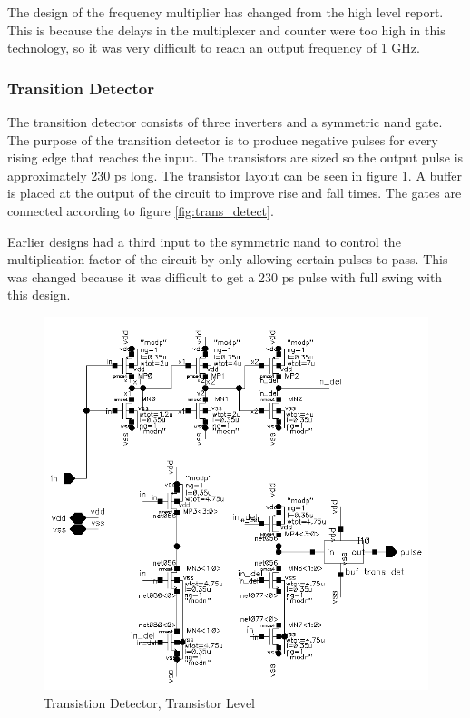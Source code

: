 \documentclass[a4paper,12pt]{article} \usepackage{graphicx}
\begin{document}
The design of the frequency multiplier has changed from the high level report.
This is because the delays in the multiplexer and counter were too high in this
technology, so it was very difficult to reach an output frequency of 1 GHz.

\subsubsection{Transition Detector}
\label{sec:trans_detect}
The transition detector consists of three inverters and a symmetric nand gate.
The purpose of the transition detector is to produce negative pulses for every
rising edge that reaches the input. The transistors are sized so the output
pulse is approximately 230 ps long. The transistor layout can be seen
in figure \ref{fig:trans_detect_trans}.
A buffer is placed at the output of the circuit to improve rise and fall times.
The gates are connected according to figure \ref{fig:trans_detect}.

Earlier designs had a third input to the symmetric nand to control the
multiplication factor of the circuit by only allowing certain pulses to pass.
This was changed because it was difficult to get a 230 ps pulse with full swing
with this design.

\begin{figure}[p]
        \centering
        \includegraphics[width=\textwidth]{../Bilder/trans_detect_trans.png}
        \caption{Transistion Detector, Transistor Level}
        \label{fig:trans_detect_trans}
\end{figure}
\end{document}
